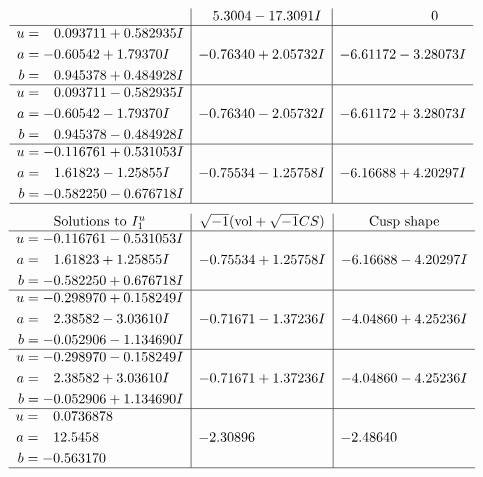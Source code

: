 \documentclass[1p]{elsarticle_modified}
\theoremstyle{definition}
\newcommand{\I}{\sqrt{-1}}
\begin{document}
$$\begin{array}{c|c|c}
 & \phantom{-}5.3004 - 17.3091 I & \phantom{-0.000000 } 0 \\ \hline\begin{aligned}
u &= \phantom{-}0.093711 + 0.582935 I \\
a &= -0.60542 + 1.79370 I \\
b &= \phantom{-}0.945378 + 0.484928 I\end{aligned}
 & -0.76340 + 2.05732 I & -6.61172 - 3.28073 I \\ \hline\begin{aligned}
u &= \phantom{-}0.093711 - 0.582935 I \\
a &= -0.60542 - 1.79370 I \\
b &= \phantom{-}0.945378 - 0.484928 I\end{aligned}
 & -0.76340 - 2.05732 I & -6.61172 + 3.28073 I \\ \hline\begin{aligned}
u &= -0.116761 + 0.531053 I \\
a &= \phantom{-}1.61823 - 1.25855 I \\
b &= -0.582250 - 0.676718 I\end{aligned}
 & -0.75534 - 1.25758 I & -6.16688 + 4.20297 I\\
 \hline 
 \end{array}$$\newpage$$\begin{array}{c|c|c}  
\text{Solutions to }I^u_{1}& \I (\text{vol} + \sqrt{-1}CS) & \text{Cusp shape}\\
 \hline 
\begin{aligned}
u &= -0.116761 - 0.531053 I \\
a &= \phantom{-}1.61823 + 1.25855 I \\
b &= -0.582250 + 0.676718 I\end{aligned}
 & -0.75534 + 1.25758 I & -6.16688 - 4.20297 I \\ \hline\begin{aligned}
u &= -0.298970 + 0.158249 I \\
a &= \phantom{-}2.38582 - 3.03610 I \\
b &= -0.052906 - 1.134690 I\end{aligned}
 & -0.71671 - 1.37236 I & -4.04860 + 4.25236 I \\ \hline\begin{aligned}
u &= -0.298970 - 0.158249 I \\
a &= \phantom{-}2.38582 + 3.03610 I \\
b &= -0.052906 + 1.134690 I\end{aligned}
 & -0.71671 + 1.37236 I & -4.04860 - 4.25236 I \\ \hline\begin{aligned}
u &= \phantom{-}0.0736878\phantom{ +0.000000I} \\
a &= \phantom{-}12.5458\phantom{ +0.000000I} \\
b &= -0.563170\phantom{ +0.000000I}\end{aligned}
 & -2.30896\phantom{ +0.000000I} & -2.48640\phantom{ +0.000000I}\\
 \hline 
 \end{array}$$\newpage\newpage\renewcommand{\arraystretch}{1}
\end{document}
